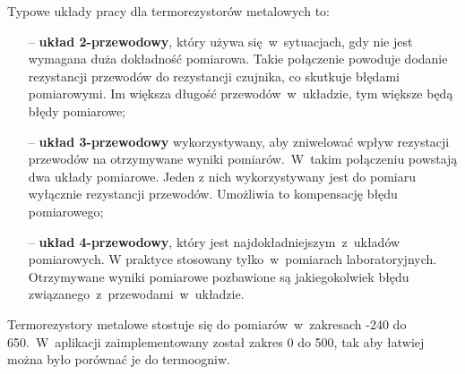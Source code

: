 Typowe układy pracy dla termorezystorów metalowych to:
\begin{itemize}
  \item [--] \textbf{układ 2-przewodowy}, który używa się~w~sytuacjach, gdy nie jest wymagana duża
        dokładność pomiarowa. Takie połączenie powoduje dodanie rezystancji przewodów do rezystancji
        czujnika, co skutkuje błędami pomiarowymi. Im większa długość przewodów~w~układzie, tym
        większe będą błędy pomiarowe;
  \item [--] \textbf{układ 3-przewodowy} wykorzystywany, aby zniwelować wpływ rezystacji przewodów
        na otrzymywane wyniki pomiarów.~W~takim połączeniu powstają dwa układy pomiarowe. Jeden z
        nich wykorzystywany jest do pomiaru wyłącznie rezystancji przewodów. Umożliwia to
        kompensację błędu pomiarowego;
  \item [--] \textbf{układ 4-przewodowy}, który jest najdokładniejszym~z~układów pomiarowych. W
        praktyce stosowany tylko~w~pomiarach laboratoryjnych. Otrzymywane wyniki pomiarowe
        pozbawione są jakiegokolwiek błędu związanego~z~przewodami~w~układzie.
\end{itemize}

Termorezystory metalowe stostuje się do pomiarów~w~zakresach -240 do 650\degC.~W~aplikacji
zaimplementowany został zakres 0 do 500\degC, tak aby łatwiej można było porównać je do termoogniw.